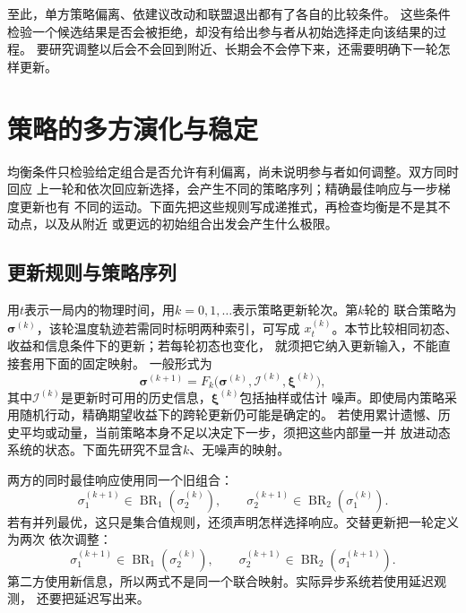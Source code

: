 至此，单方策略偏离、依建议改动和联盟退出都有了各自的比较条件。
这些条件检验一个候选结果是否会被拒绝，却没有给出参与者从初始选择走向该结果的过程。
要研究调整以后会不会回到附近、长期会不会停下来，还需要明确下一轮怎样更新。

\section{策略的多方演化与稳定}
\label{sec:game-policy-evolution}

均衡条件只检验给定组合是否允许有利偏离，尚未说明参与者如何调整。双方同时回应
上一轮和依次回应新选择，会产生不同的策略序列；精确最佳响应与一步梯度更新也有
不同的运动。下面先把这些规则写成递推式，再检查均衡是不是其不动点，以及从附近
或更远的初始组合出发会产生什么极限。

\subsection{更新规则与策略序列}
\label{sec:game-update-sequences}

用\(t\)表示一局内的物理时间，用\(k=0,1,\ldots\)表示策略更新轮次。第\(k\)轮的
联合策略为\(\bm\sigma^{(k)}\)，该轮温度轨迹若需同时标明两种索引，可写成
\(x_t^{(k)}\)。本节比较相同初态、收益和信息条件下的更新；若每轮初态也变化，
就须把它纳入更新输入，不能直接套用下面的固定映射。
一般形式为
\[
  \bm\sigma^{(k+1)}
  =F_k\bigl(\bm\sigma^{(k)},\mathscr I^{(k)},\bm\xi^{(k)}\bigr),
\]
其中\(\mathscr I^{(k)}\)是更新时可用的历史信息，\(\bm\xi^{(k)}\)包括抽样或估计
噪声。即使局内策略采用随机行动，精确期望收益下的跨轮更新仍可能是确定的。
若使用累计遗憾、历史平均或动量，当前策略本身不足以决定下一步，须把这些内部量一并
放进动态系统的状态。下面先研究不显含\(k\)、无噪声的映射。

两方的同时最佳响应使用同一个旧组合：
\begin{equation}
  \sigma_1^{(k+1)}\in\operatorname{BR}_1(\sigma_2^{(k)}),
  \qquad
  \sigma_2^{(k+1)}\in\operatorname{BR}_2(\sigma_1^{(k)}).
  \label{eq:game-simultaneous-best-response}
\end{equation}
若有并列最优，这只是集合值规则，还须声明怎样选择响应。交替更新把一轮定义为两次
依次调整：
\begin{equation}
  \sigma_1^{(k+1)}\in\operatorname{BR}_1(\sigma_2^{(k)}),
  \qquad
  \sigma_2^{(k+1)}\in\operatorname{BR}_2(\sigma_1^{(k+1)}).
  \label{eq:game-alternating-best-response}
\end{equation}
第二方使用新信息，所以两式不是同一个联合映射。实际异步系统若使用延迟观测，
还要把延迟写出来。

